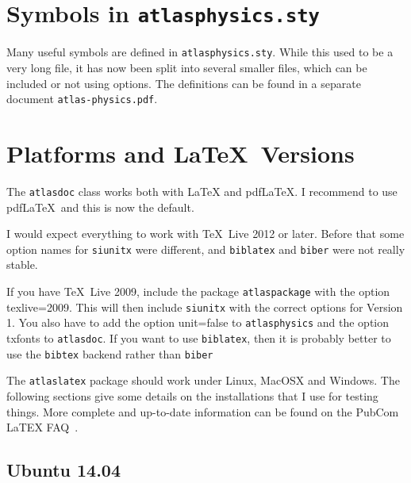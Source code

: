 \documentclass[UKenglish]{latex/atlasdoc}
\newcommand{\File}[1]{\texttt{#1}\xspace}
\newcommand{\Option}[1]{\textsf{#1}\xspace}
\newcommand{\Package}[1]{\texttt{#1}\xspace}
\begin{document}
\section{Symbols in \texttt{atlasphysics.sty}}
\label{sec:atlasphysics}

Many useful symbols are defined in \texttt{atlasphysics.sty}.
While this used to be a very long file, it has now been split into several smaller files,
which can be included or not using options.
The definitions can be found in a separate document \File{atlas-physics.pdf}.


\section{Platforms and \LaTeX\ Versions}
\label{sec:version}

The \Package{atlasdoc} class works both with \LaTeX{} and pdf\LaTeX{}.
I recommend to use pdf\LaTeX\ and this is now the default.

I would expect everything to work with \TeX\ Live 2012 or later.
Before that some option names for \Package{siunitx} were different, 
 and \Package{biblatex} and \Package{biber} were not really stable.

If you have \TeX\ Live 2009, include the package \Package{atlaspackage} with the option
\Option{texlive=2009}.
This will then include \Package{siunitx} with the correct options for Version 1.
You also have to add the option \Option{unit=false} to \Package{atlasphysics}
and the option \Option{txfonts} to \Package{atlasdoc}.
If you want to use \Package{biblatex},
then it is probably better to use the \Package{bibtex} backend rather than \Package{biber}

The \Package{atlaslatex} package should work under Linux, MacOSX and Windows.
The following sections give some details on the installations that I use for testing things.
More complete and up-to-date information can be found on the PubCom LaTEX FAQ~\cite{latex-faq}.


\subsection{Ubuntu 14.04}
\end{document}
